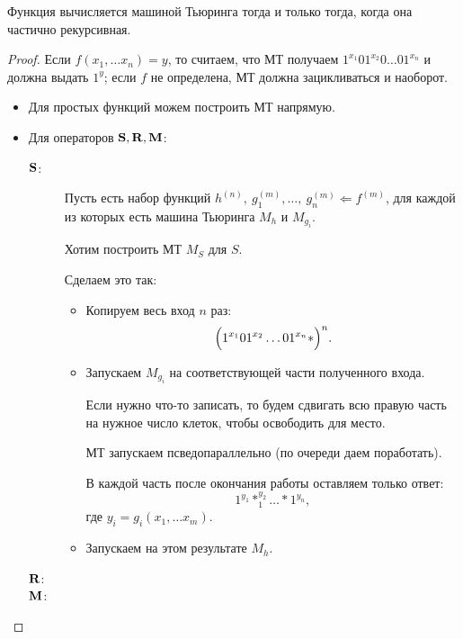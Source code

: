 \begin{thm}
    Функция вычисляется машиной Тьюринга тогда и только тогда, когда она частично рекурсивная.
\end{thm}
\begin{proof}
			Если $ f(x_1, \ldots x_n) = y$, то считаем, что МТ получаем $ 1^{x_1}01^{x_2}0\ldots 01^{x_n}$ и должна выдать $ 1^{y}$; если  $ f$ не определена, МТ должна зацикливаться и наоборот.
    \begin{description}
        \item {} 
			\begin{itemize}
				\item Для простых функций можем построить МТ напрямую.
				\item Для операторов $ \S, \R, \M$:
					\begin{description}
						\item[$ \S$:]
							Пусть есть набор функций $ h^{(n)}, ~ g_1^{(m)}, \ldots , ~ g_n^{(m)} \Longleftarrow f^{(m)}$, для каждой из которых есть машина Тьюринга $ M_{h}$ и $ M_{g_{i}}$. 

							Хотим построить МТ $ M_{S}$ для $ S$.

							Сделаем это так:
							\begin{itemize}
								\item Копируем весь вход $ n$ раз:
									\[
										\Bigl(1^{x_1}01^{x_2}\ldots 01^{x_n} \ast \Bigr)^{n}
									.\] 
								\item Запускаем $ M_{g_i}$ на соответствующей части полученного входа. 

							Если нужно что-то записать, то будем сдвигать всю правую часть на нужное число клеток, чтобы освободить для место.

							МТ запускаем  псведопараллельно (по очереди даем поработать).

							В каждой часть после окончания работы оставляем только ответ:
							\[
								1^{y_1}\ast_1^{y_2}\ldots \ast1^{y_n}
							,\] 
							где $ y_i = g_i(x_1, \ldots x_m)$.
						\item Запускаем на этом результате $ M_{h}$.
							\end{itemize}

						\item[$ \R$:]
						\item[$ \M$:]
					\end{description}
			\end{itemize}
        \item {} 
    \end{description} 
\end{proof}

